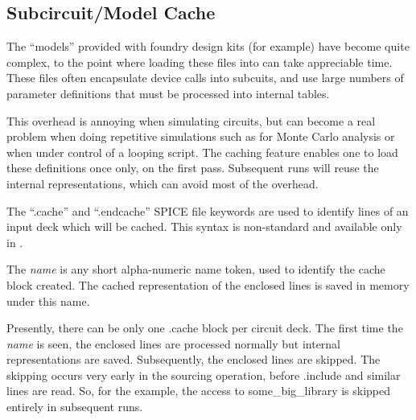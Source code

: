 
\subsection{Subcircuit/Model Cache}



The ``models'' provided with foundry design kits (for example) have
become quite complex, to the point where loading these files into
{\WRspice} can take appreciable time.  These files often encapsulate
device calls into subcuits, and use large numbers of parameter
definitions that must be processed into internal tables.

This overhead is annoying when simulating circuits, but can become a
real problem when doing repetitive simulations such as for Monte Carlo
analysis or when under control of a looping script.  The caching
feature enables one to load these definitions once only, on the first
pass.  Subsequent runs will reuse the internal representations, which
can avoid most of the overhead.

The ``{\vt .cache}'' and ``{\vt .endcache}'' SPICE file keywords are
used to identify lines of an input deck which will be cached.  This
syntax is non-standard and available only in {\WRspice}.

The {\it name} is any short alpha-numeric name token, used to identify
the cache block created.  The cached representation of the enclosed
lines is saved in {\WRspice} memory under this name.

Presently, there can be only one {\vt .cache} block per circuit deck. 
The first time the {\it name} is seen, the enclosed lines are
processed normally but internal representations are saved. 
Subsequently, the enclosed lines are skipped.  The skipping occurs
very early in the sourcing operation, before {\vt .include} and
similar lines are read.  So, for the example, the access to {\vt
some\_big\_library} is skipped entirely in subsequent runs.

